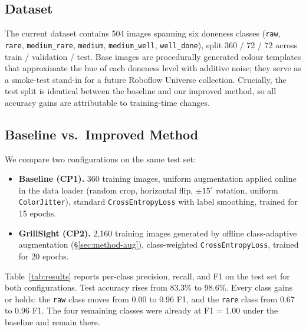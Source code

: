 \documentclass{article}
\begin{document}
\subsection{Dataset}
The current dataset contains 504 images spanning six doneness classes
(\texttt{raw}, \texttt{rare}, \texttt{medium\_rare}, \texttt{medium},
\texttt{medium\_well}, \texttt{well\_done}), split 360 / 72 / 72 across
train / validation / test. Base images are procedurally generated colour
templates that approximate the hue of each doneness level with additive noise;
they serve as a smoke-test stand-in for a future Roboflow Universe
\citep{dwyer2022roboflow} collection. Crucially, the test split is identical
between the baseline and our improved method, so all accuracy gains are
attributable to training-time changes.

\subsection{Baseline vs.\ Improved Method}

We compare two configurations on the same test set:

\begin{itemize}
  \item \textbf{Baseline (CP1).} 360 training images, uniform augmentation
  applied online in the data loader (random crop, horizontal flip, $\pm15^\circ$
  rotation, uniform \texttt{ColorJitter}), standard \texttt{CrossEntropyLoss}
  with label smoothing, trained for 15 epochs.
  \item \textbf{GrillSight (CP2).} 2{,}160 training images generated by offline
  class-adaptive augmentation (\S\ref{sec:method-aug}), class-weighted
  \texttt{CrossEntropyLoss}, trained for 20 epochs.
\end{itemize}

Table~\ref{tab:results} reports per-class precision, recall, and F1 on the
test set for both configurations. Test accuracy rises from
83.3\% to 98.6\%. Every class gains or holds: the \texttt{raw} class moves
from 0.00 to 0.96 F1, and the \texttt{rare} class from 0.67 to 0.96
F1. The four remaining classes were already at F1 = 1.00 under the baseline
and remain there.
\end{document}
